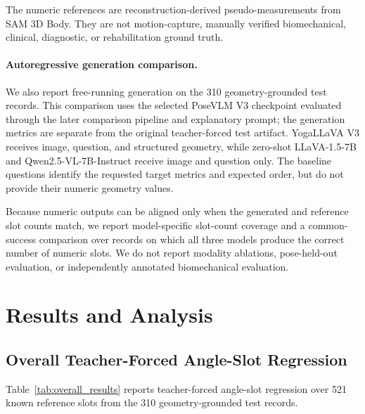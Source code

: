 The numeric references are reconstruction-derived pseudo-measurements
from SAM 3D Body. They are not motion-capture, manually verified
biomechanical, clinical, diagnostic, or rehabilitation ground truth.

\paragraph{Autoregressive generation comparison.}
We also report free-running generation on the 310 geometry-grounded test
records. This comparison uses the selected PoseVLM V3 checkpoint
evaluated through the later comparison pipeline and explanatory prompt;
the generation metrics are separate from the original teacher-forced
test artifact. YogaLLaVA V3 receives image, question, and structured
geometry, while zero-shot LLaVA-1.5-7B and Qwen2.5-VL-7B-Instruct
receive image and question only. The baseline questions identify the
requested target metrics and expected order, but do not provide their
numeric geometry values.

Because numeric outputs can be aligned only when the generated and
reference slot counts match, we report model-specific slot-count
coverage and a common-success comparison over records on which all three
models produce the correct number of numeric slots. We do not report
modality ablations, pose-held-out evaluation, or independently annotated
biomechanical evaluation.

\section{Results and Analysis}
\label{sec:results}

\subsection{Overall Teacher-Forced Angle-Slot Regression}
\label{sec:overall_results}

Table~\ref{tab:overall_results} reports teacher-forced angle-slot
regression over 521 known reference slots from the 310
geometry-grounded test records.

